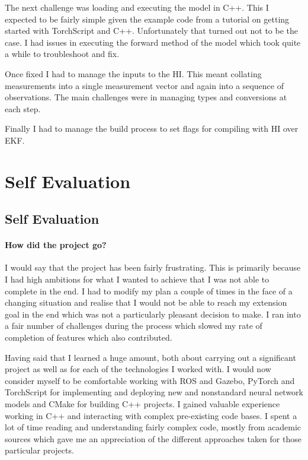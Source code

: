 \documentclass[]{../resources/final_report}
\begin{document}
The next challenge was loading and executing the model in C++. This I expected to be fairly simple given
the example code from a tutorial on getting started with TorchScript and C++. Unfortunately that turned out 
not to be the case. I had issues in executing the forward method of the model which took quite a while to 
troubleshoot and fix. 

Once fixed I had to manage the inputs to the HI. This meant collating measurements into a single measurement 
vector and again into a sequence of observations. The main challenges were in managing types and conversions
at each step.

Finally I had to manage the build process to set flags for compiling with HI over EKF.


\chapter{Self Evaluation}


\section{Self Evaluation}

\subsubsection{How did the project go?}

I would say that the project has been fairly frustrating. This is primarily because I had high 
ambitions for what I wanted to achieve that I was not able to complete in the end. I had to modify
my plan a couple of times in the face of a changing situation and realise that I would not be able
to reach my extension goal in the end which was not a particularly pleasant decision to make. I ran
into a fair number of challenges during the process which slowed my rate of completion of features 
which also contributed.

Having said that I learned a huge amount, both about carrying out a significant project
as well as for each of the technologies I worked with. I would now consider myself to be comfortable 
working with ROS and Gazebo, PyTorch and TorchScript for implementing and deploying new and 
nonstandard neural network models and CMake for building C++ projects. I gained valuable 
experience working in C++ and interacting with complex pre-existing code bases. I spent a lot 
of time reading and understanding fairly complex code, mostly from academic sources which gave me an 
appreciation of the different approaches taken for those particular projects.
\end{document}
